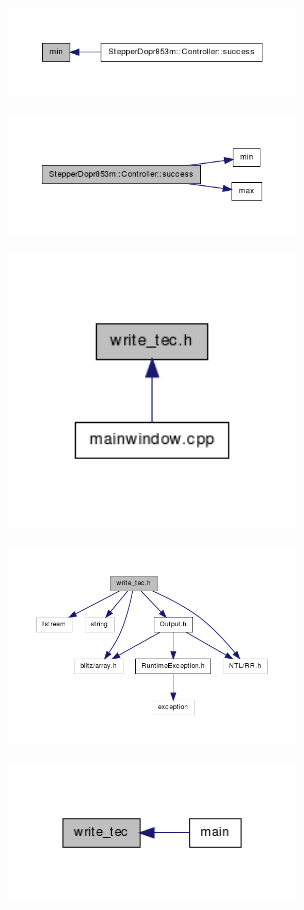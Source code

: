 \includegraphics[width=3in]{figures/ntl__ext_8h_aebfb5c962cc9f3c91b927a50eb365ad3_icgraph.png}

\includegraphics[width=3in]{figures/struct_stepper_dopr853m_1_1_controller_a03aa3bc288f933a6ea83c911e686011f_cgraph.png}

\includegraphics[width=3in]{figures/write__tec_8h__dep__incl.png}

\includegraphics[width=3in]{figures/write__tec_8h__incl.png}

\includegraphics[width=3in]{figures/write__tec_8h_a68e135aa96fa65bac5a869be50bcd7cc_icgraph.png}


